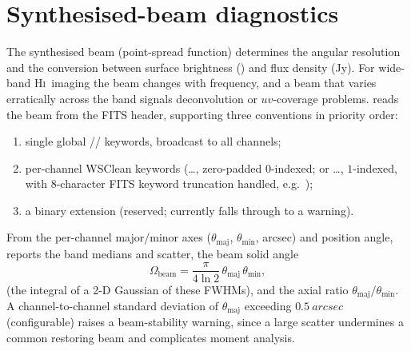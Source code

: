 \documentclass[11pt,a4paper]{article}
\begin{document}
\section{Synthesised-beam diagnostics}\label{sec:beam}
The synthesised beam (point-spread function) determines the angular resolution
and the conversion between surface brightness (\jybeam) and flux density (Jy).
For wide-band \textsc{Hi}\ imaging the beam changes with frequency, and a beam
that varies erratically across the band signals deconvolution or $uv$-coverage
problems.  reads the beam from the FITS header, supporting
three conventions in priority order:
\begin{enumerate}[noitemsep,topsep=2pt]
  \item single global // keywords, broadcast to
        all channels;
  \item per-channel WSClean keywords \citep{offringa2014} (\dots,
        zero-padded $0$-indexed; or \dots, $1$-indexed, with
        $8$-character FITS keyword truncation handled, e.g.\ );
  \item a  binary extension (reserved; currently falls through
        to a warning).
\end{enumerate}
From the per-channel major/minor axes ($\theta_{\mathrm{maj}}$,
$\theta_{\mathrm{min}}$, arcsec) and position angle, 
reports the band medians and scatter, the beam solid angle
\begin{equation}
  \Omega_{\mathrm{beam}} = \frac{\pi}{4\ln 2}\,\theta_{\mathrm{maj}}\,\theta_{\mathrm{min}},
  \label{eq:beamarea}
\end{equation}
(the integral of a 2-D Gaussian of these FWHMs), and the axial ratio
$\theta_{\mathrm{maj}}/\theta_{\mathrm{min}}$. A channel-to-channel standard
deviation of $\theta_{\mathrm{maj}}$ exceeding $\SI{0.5}{arcsec}$ (configurable)
raises a beam-stability warning, since a large scatter undermines a common
restoring beam and complicates moment analysis.

\end{document}
